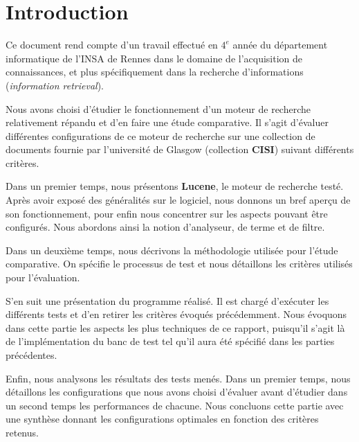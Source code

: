 \section*{Introduction}

Ce document rend compte d’un travail effectué en $4^{e}$ année du département informatique de l’INSA de Rennes dans le domaine de l’acquisition de connaissances, et plus spécifiquement dans la recherche d’informations (\textit{information retrieval}).

Nous avons choisi d’étudier le fonctionnement d’un moteur de recherche relativement répandu et d’en faire une étude comparative. Il s’agit d’évaluer différentes configurations de ce moteur de recherche sur une collection de documents fournie par l’université de Glasgow (collection \textbf{CISI}) suivant différents critères.

Dans un premier temps, nous présentons \textbf{Lucene}, le moteur de recherche testé. Après avoir exposé des généralités sur le logiciel, nous donnons un bref aperçu de son fonctionnement, pour enfin nous concentrer sur les aspects pouvant être configurés. Nous abordons ainsi la notion d’analyseur, de terme et de filtre.

Dans un deuxième temps, nous décrivons la méthodologie utilisée pour l’étude comparative. On spécifie le processus de test et nous détaillons les critères utilisés pour l’évaluation.

S’en suit une présentation du programme réalisé. Il est chargé d’exécuter les différents tests et d’en retirer les critères évoqués précédemment. Nous évoquons dans cette partie les aspects les plus techniques de ce rapport, puisqu’il s’agit là de l’implémentation du banc de test tel qu’il aura été spécifié dans les parties précédentes.

Enfin, nous analysons les résultats des tests menés. Dans un premier temps, nous détaillons les configurations que nous avons choisi d’évaluer avant d’étudier dans un second temps les performances de chacune. Nous concluons cette partie avec une synthèse donnant les configurations optimales en fonction des critères retenus.